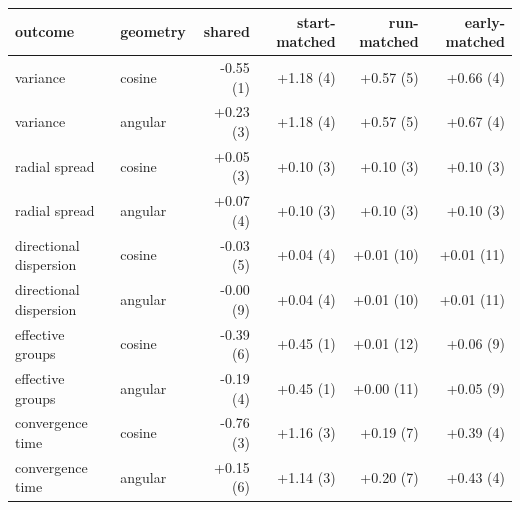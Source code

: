 \begin{tabular}{llrrrr}
\toprule
outcome & geometry & shared & start-matched & run-matched & early-matched \\
\midrule
variance & cosine & -0.55 (1) & +1.18 (4) & +0.57 (5) & +0.66 (4) \\
variance & angular & +0.23 (3) & +1.18 (4) & +0.57 (5) & +0.67 (4) \\
radial spread & cosine & +0.05 (3) & +0.10 (3) & +0.10 (3) & +0.10 (3) \\
radial spread & angular & +0.07 (4) & +0.10 (3) & +0.10 (3) & +0.10 (3) \\
directional dispersion & cosine & -0.03 (5) & +0.04 (4) & +0.01 (10) & +0.01 (11) \\
directional dispersion & angular & -0.00 (9) & +0.04 (4) & +0.01 (10) & +0.01 (11) \\
effective groups & cosine & -0.39 (6) & +0.45 (1) & +0.01 (12) & +0.06 (9) \\
effective groups & angular & -0.19 (4) & +0.45 (1) & +0.00 (11) & +0.05 (9) \\
convergence time & cosine & -0.76 (3) & +1.16 (3) & +0.19 (7) & +0.39 (4) \\
convergence time & angular & +0.15 (6) & +1.14 (3) & +0.20 (7) & +0.43 (4) \\
\bottomrule
\end{tabular}
